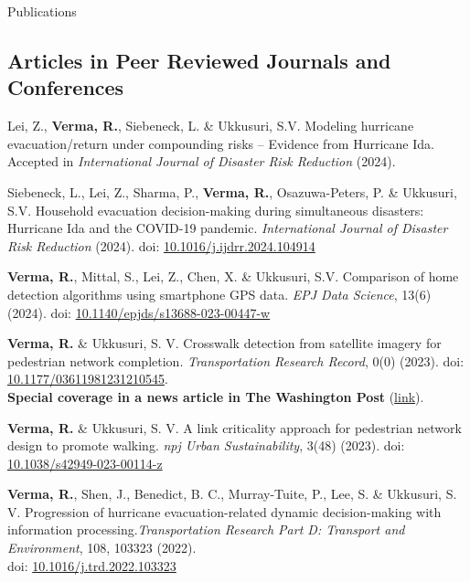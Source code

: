\documentclass{CV} %
\begin{document}
\begin{rSection}{Publications}
    \subsection*{Articles in Peer Reviewed Journals and Conferences}
    \begin{etaremune}
        \item Lei, Z., \textbf{Verma, R.}, Siebeneck, L. \& Ukkusuri, S.V. Modeling hurricane evacuation/return under compounding risks – Evidence from Hurricane Ida. Accepted in \textit{International Journal of Disaster Risk Reduction} (2024).

        \item Siebeneck, L., Lei, Z., Sharma, P., \textbf{Verma, R.}, Osazuwa-Peters, P. \& Ukkusuri, S.V. Household evacuation decision-making during simultaneous disasters: Hurricane Ida and the COVID-19 pandemic.
        \textit{International Journal of Disaster Risk Reduction} (2024). doi: \href{https://doi.org/10.1016/j.ijdrr.2024.104914}{10.1016/j.ijdrr.2024.104914}

        \item \textbf{Verma, R.}, Mittal, S., Lei, Z., Chen, X. \& Ukkusuri, S.V. Comparison of home detection algorithms using smartphone GPS data.
        \textit{EPJ Data Science}, 13(6) (2024). doi: \href{https://doi.org/10.1140/epjds/s13688-023-00447-w}{10.1140/epjds/s13688-023-00447-w}
        
        \item \textbf{Verma, R.} \& Ukkusuri, S. V. Crosswalk detection from satellite imagery for pedestrian network completion. \textit{Transportation Research Record}, 0(0) (2023). doi: \href{https://doi.org/10.1177/03611981231210545}{10.1177/03611981231210545}.
        \\ \textbf{Special coverage in a news article in The Washington Post} (\href{https://www.washingtonpost.com/transportation/2023/02/25/sidewalks-crosswalks-study/}{link}).
        
        \item \textbf{Verma, R.} \& Ukkusuri, S. V. A link criticality approach for pedestrian network design to promote walking. \textit{npj Urban Sustainability}, 3(48) (2023). doi: \href{https://doi.org/10.1038/s42949-023-00114-z}{10.1038/s42949-023-00114-z}
        
        \item \textbf{Verma, R.}, Shen, J., Benedict, B. C., Murray-Tuite, P., Lee, S. \& Ukkusuri, S. V. Progression of hurricane evacuation-related dynamic decision-making with information processing.\textit{Transportation Research Part D: Transport and Environment}, 108, 103323 (2022).\\doi: \href{https://doi.org/10.1016/j.trd.2022.103323}{10.1016/j.trd.2022.103323}
        

\end{etaremune}
\end{rSection}
\end{document}
